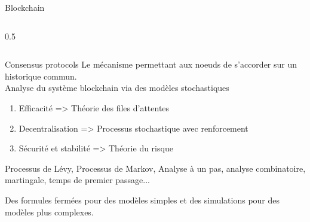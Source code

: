 \documentclass{beamer}
\begin{document}
\begin{frame}{Blockchain}
\begin{columns}
\begin{column}{0.5\textwidth}
\begin{center}
\end{center}
\end{column}
\end{columns}

\end{frame}

\begin{frame}{Consensus protocols}
Le mécanisme permettant aux noeuds de s'accorder sur un historique commun.\\
\vspace{0.3cm}
Analyse du système blockchain via des modèles stochastiques
\begin{enumerate}
  \item Efficacité => Théorie des files d'attentes
  
  \item Decentralisation => Processus stochastique avec renforcement
  
  \item Sécurité et stabilité => Théorie du risque
\end{enumerate}
\begin{tcolorbox}[enhanced,drop shadow, title=Objet mathématique]
    Processus de Lévy, Processus de Markov, Analyse à un pas, analyse combinatoire, martingale, temps de premier passage...
\end{tcolorbox}
Des formules fermées pour des modèles simples et des simulations pour des modèles plus complexes.
\end{frame}
\end{document}
